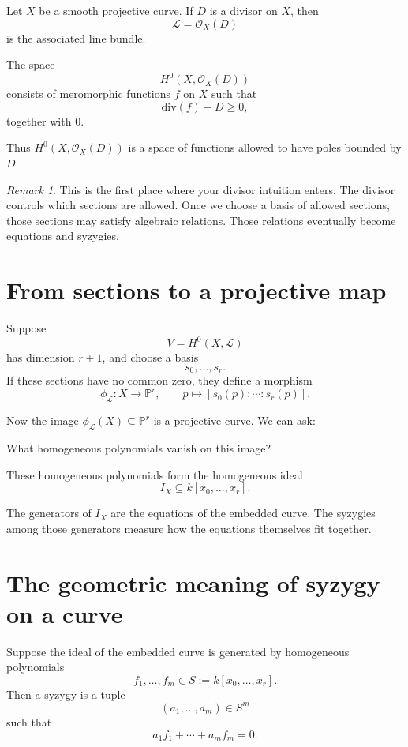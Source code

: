 \documentclass[11pt]{article}
\theoremstyle{definition}
\theoremstyle{remark}
\newtheorem{remark}[theorem]{Remark}
\newcommand{\PP}{\mathbb{P}}
\newcommand{\cO}{\mathcal{O}}
\newcommand{\cL}{\mathcal{L}}
\newcommand{\divv}{\mathrm{div}}
\begin{document}
	Let \(X\) be a smooth projective curve. If \(D\) is a divisor on \(X\), then
	\[
	\cL=\cO_X(D)
	\]
	is the associated line bundle.
	
	The space
	\[
	H^0(X,\cO_X(D))
	\]
	consists of meromorphic functions \(f\) on \(X\) such that
	\[
	\divv(f)+D\ge 0,
	\]
	together with \(0\).
	
	Thus \(H^0(X,\cO_X(D))\) is a space of functions allowed to have poles bounded by \(D\).
	
	\begin{remark}
		This is the first place where your divisor intuition enters. The divisor controls which sections are allowed. Once we choose a basis of allowed sections, those sections may satisfy algebraic relations. Those relations eventually become equations and syzygies.
	\end{remark}
	
	\section{From sections to a projective map}
	
	Suppose
	\[
	V=H^0(X,\cL)
	\]
	has dimension \(r+1\), and choose a basis
	\[
	s_0,\dots,s_r.
	\]
	If these sections have no common zero, they define a morphism
	\[
	\phi_{\cL}:X\to \PP^r,\qquad
	p\mapsto [s_0(p):\cdots:s_r(p)].
	\]
	
	Now the image \(\phi_{\cL}(X)\subseteq \PP^r\) is a projective curve. We can ask:
	
	\begin{center}
		What homogeneous polynomials vanish on this image?
	\end{center}
	
	These homogeneous polynomials form the homogeneous ideal
	\[
	I_X \subseteq k[x_0,\dots,x_r].
	\]
	
	The generators of \(I_X\) are the equations of the embedded curve.  
	The syzygies among those generators measure how the equations themselves fit together.
	
	\section{The geometric meaning of syzygy on a curve}
	
	Suppose the ideal of the embedded curve is generated by homogeneous polynomials
	\[
	f_1,\dots,f_m\in S:=k[x_0,\dots,x_r].
	\]
	Then a syzygy is a tuple
	\[
	(a_1,\dots,a_m)\in S^m
	\]
	such that
	\[
	a_1f_1+\cdots+a_mf_m=0.
	\]
	
\end{document}
